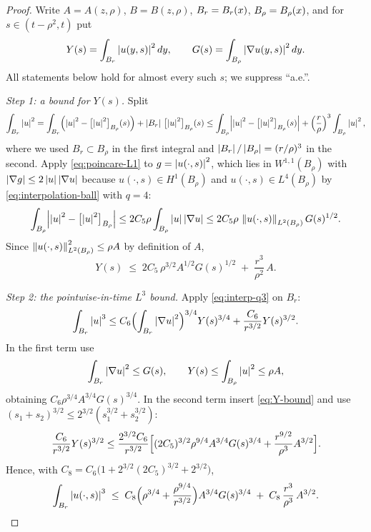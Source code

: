 \documentclass[11pt,reqno]{amsart}
\begin{document}
\begin{proof}
Write $A=A(z,\rho)$, $B=B(z,\rho)$, $B_{r}=B_{r}(x)$, $B_{\rho}=B_{\rho}(x)$,
and for $s\in(t-\rho^{2},t)$ put
\[
  Y(s)=\int_{B_{r}}\left\lvert u(y,s) \right\rvert^{2}dy,
  \qquad
  G(s)=\int_{B_{\rho}}\left\lvert \nabla u(y,s) \right\rvert^{2}dy .
\]
All statements below hold for almost every such $s$; we suppress ``a.e.''.

\emph{Step 1: a bound for $Y(s)$.} Split
\[
  \int_{B_{r}}\left\lvert u \right\rvert^{2}
  =\int_{B_{r}}\Bigl(\left\lvert u \right\rvert^{2}-\bigl[\left\lvert u \right\rvert^{2}\bigr]_{B_{\rho}}(s)\Bigr)
   +\left\lvert B_{r} \right\rvert\,\bigl[\left\lvert u \right\rvert^{2}\bigr]_{B_{\rho}}(s)
  \le\int_{B_{\rho}}\Bigl|\left\lvert u \right\rvert^{2}-\bigl[\left\lvert u \right\rvert^{2}\bigr]_{B_{\rho}}(s)\Bigr|
   +\Bigl(\frac r\rho\Bigr)^{3}\int_{B_{\rho}}\left\lvert u \right\rvert^{2},
\]
where we used $B_{r}\subset B_{\rho}$ in the first integral and
$\left\lvert B_{r} \right\rvert/\left\lvert B_{\rho} \right\rvert=(r/\rho)^{3}$ in the second. Apply
\eqref{eq:poincare-L1} to $g=\left\lvert u(\cdot,s) \right\rvert^{2}$, which lies in
$W^{1,1}(B_{\rho})$ with $\left\lvert \nabla g \right\rvert\le2\left\lvert u \right\rvert\left\lvert \nabla u \right\rvert$ because
$u(\cdot,s)\in H^{1}(B_{\rho})$ and $u(\cdot,s)\in L^{4}(B_{\rho})$ by
\eqref{eq:interpolation-ball} with $q=4$:
\[
  \int_{B_{\rho}}\Bigl|\left\lvert u \right\rvert^{2}-\bigl[\left\lvert u \right\rvert^{2}\bigr]_{B_{\rho}}\Bigr|
  \le 2C_{5}\rho\int_{B_{\rho}}\left\lvert u \right\rvert\left\lvert \nabla u \right\rvert
  \le 2C_{5}\rho\,\left\lVert u(\cdot,s) \right\rVert_{L^{2}(B_{\rho})}G(s)^{1/2} .
\]
Since $\left\lVert u(\cdot,s) \right\rVert_{L^{2}(B_{\rho})}^{2}\le\rho A$ by definition of $A$,
\begin{equation}\label{eq:Y-bound}
  Y(s)\;\le\;2C_{5}\,\rho^{3/2}A^{1/2}G(s)^{1/2}
     \;+\;\frac{r^{3}}{\rho^{2}}\,A .
\end{equation}

\emph{Step 2: the pointwise-in-time $L^{3}$ bound.} Apply \eqref{eq:interp-q3}
on $B_{r}$:
\[
  \int_{B_{r}}\left\lvert u \right\rvert^{3}
  \le C_{6}\Bigl(\int_{B_{r}}\left\lvert \nabla u \right\rvert^{2}\Bigr)^{3/4}Y(s)^{3/4}
    +\frac{C_{6}}{r^{3/2}}Y(s)^{3/2} .
\]
In the first term use
\[
 \int_{B_{r}}\left\lvert \nabla u \right\rvert^{2}\le G(s),
 \qquad Y(s)\le\int_{B_{\rho}}\left\lvert u \right\rvert^{2}\le\rho A,
\]
obtaining
$C_{6}\rho^{3/4}A^{3/4}G(s)^{3/4}$. In the second term insert
\eqref{eq:Y-bound} and use
$(s_{1}+s_{2})^{3/2}\le2^{3/2}(s_{1}^{3/2}+s_{2}^{3/2})$:
\[
  \frac{C_{6}}{r^{3/2}}Y(s)^{3/2}
  \le\frac{2^{3/2}C_{6}}{r^{3/2}}
    \Bigl[(2C_{5})^{3/2}\rho^{9/4}A^{3/4}G(s)^{3/4}
      +\frac{r^{9/2}}{\rho^{3}}A^{3/2}\Bigr].
\]
Hence, with $C_{8}=C_{6}\bigl(1+2^{3/2}(2C_{5})^{3/2}+2^{3/2}\bigr)$,
\begin{equation}\label{eq:L3-pointwise}
  \int_{B_{r}}\left\lvert u(\cdot,s) \right\rvert^{3}
  \;\le\;C_{8}\Bigl(\rho^{3/4}+\frac{\rho^{9/4}}{r^{3/2}}\Bigr)A^{3/4}G(s)^{3/4}
    \;+\;C_{8}\,\frac{r^{3}}{\rho^{3}}\,A^{3/2}.
\end{equation}


\end{proof}
\end{document}
